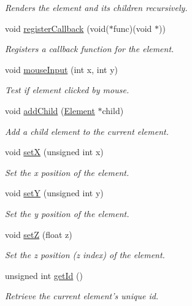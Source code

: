 \begin{DoxyCompactItemize}
\begin{DoxyCompactList}\small\item\em Renders the element and its children recursively. \end{DoxyCompactList}\item 
void \hyperlink{class_element_af3291346742556571a5c8578d2fc7026}{register\-Callback} (void($\ast$func)(void $\ast$))
\begin{DoxyCompactList}\small\item\em Registers a callback function for the element. \end{DoxyCompactList}\item 
void \hyperlink{class_element_aa1a3a8de669ecc840d2f2fb1e338300f}{mouse\-Input} (int x, int y)
\begin{DoxyCompactList}\small\item\em Test if element clicked by mouse. \end{DoxyCompactList}\item 
void \hyperlink{class_element_a5e5de37f6b79a3a952d021ba15b3912d}{add\-Child} (\hyperlink{class_element}{Element} $\ast$child)
\begin{DoxyCompactList}\small\item\em Add a child element to the current element. \end{DoxyCompactList}\item 
void \hyperlink{class_element_ae222484e55d330ddfd7869510b10ec09}{set\-X} (unsigned int x)
\begin{DoxyCompactList}\small\item\em Set the x position of the element. \end{DoxyCompactList}\item 
void \hyperlink{class_element_a95ea0342571b8521028b8321ba915227}{set\-Y} (unsigned int y)
\begin{DoxyCompactList}\small\item\em Set the y position of the element. \end{DoxyCompactList}\item 
void \hyperlink{class_element_aab1f2476247f365f6755dc2913d205b3}{set\-Z} (float z)
\begin{DoxyCompactList}\small\item\em Set the z position (z index) of the element. \end{DoxyCompactList}\item 
unsigned int \hyperlink{class_element_a4d41f5af2e3e5787945915a3b803131a}{get\-Id} ()
\begin{DoxyCompactList}\small\item\em Retrieve the current element's unique id. \end{DoxyCompactList}\item 

\end{DoxyCompactItemize}
